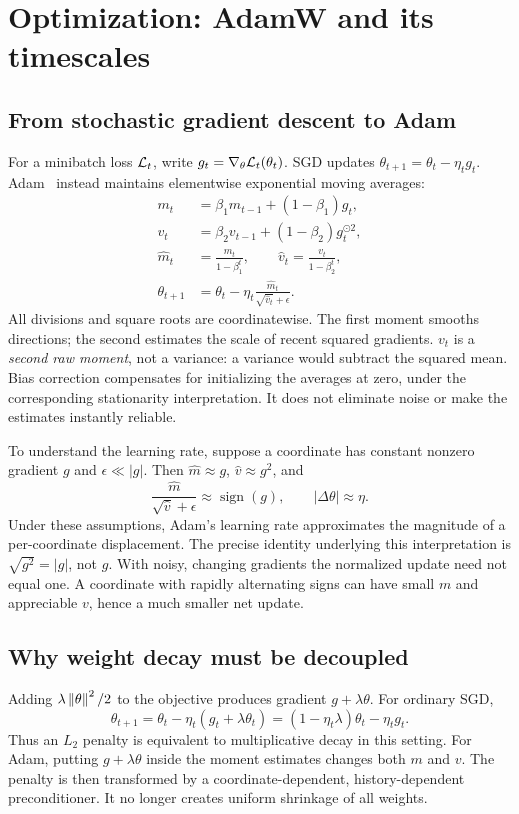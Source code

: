 \chapter{Optimization: AdamW and its timescales}
\section{From stochastic gradient descent to Adam}
For a minibatch loss $\mathcal L_t$, write $g_t=\nabla_\theta\mathcal L_t(\theta_t)$. SGD updates $\theta_{t+1}=\theta_t-\eta_tg_t$. Adam~\cite{adam} instead maintains elementwise exponential moving averages:
\begin{align}
 m_t&=\beta_1m_{t-1}+(1-\beta_1)g_t,\\
 v_t&=\beta_2v_{t-1}+(1-\beta_2)g_t^{\odot2},\\
 \widehat m_t&=\frac{m_t}{1-\beta_1^t},\qquad
 \widehat v_t=\frac{v_t}{1-\beta_2^t},\\
 \theta_{t+1}&=\theta_t-\eta_t\frac{\widehat m_t}{\sqrt{\widehat v_t}+\epsilon}.
\end{align}
All divisions and square roots are coordinatewise. The first moment smooths directions; the second estimates the scale of recent squared gradients. $v_t$ is a \emph{second raw moment}, not a variance: a variance would subtract the squared mean. Bias correction compensates for initializing the averages at zero, under the corresponding stationarity interpretation. It does not eliminate noise or make the estimates instantly reliable.

To understand the learning rate, suppose a coordinate has constant nonzero gradient $g$ and $\epsilon\ll|g|$. Then $\widehat m\approx g$, $\widehat v\approx g^2$, and
\begin{equation}
 \frac{\widehat m}{\sqrt{\widehat v}+\epsilon}\approx\operatorname{sign}(g),
 \qquad |\Delta\theta|\approx\eta.
\end{equation}
Under these assumptions, Adam's learning rate approximates the magnitude of a per-coordinate displacement. The precise identity underlying this interpretation is $\sqrt{g^2}=|g|$, not $g$. With noisy, changing gradients the normalized update need not equal one. A coordinate with rapidly alternating signs can have small $m$ and appreciable $v$, hence a much smaller net update.

\section{Why weight decay must be decoupled}
Adding $\lambda\left\lVert\theta\right\rVert^2/2$ to the objective produces gradient $g+\lambda\theta$. For ordinary SGD,
\begin{equation}
 \theta_{t+1}=\theta_t-\eta_t(g_t+\lambda\theta_t)
 =(1-\eta_t\lambda)\theta_t-\eta_tg_t.
\end{equation}
Thus an $L_2$ penalty is equivalent to multiplicative decay in this setting. For Adam, putting $g+\lambda\theta$ inside the moment estimates changes both $m$ and $v$. The penalty is then transformed by a coordinate-dependent, history-dependent preconditioner. It no longer creates uniform shrinkage of all weights.

